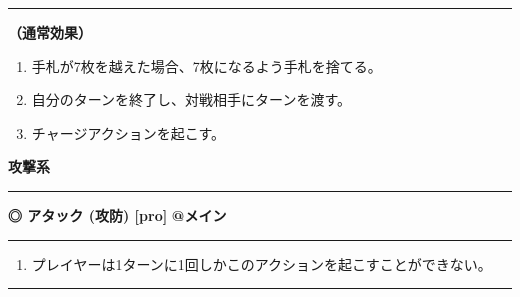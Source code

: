 \documentclass[twocolumn,a5paper,papersize,10pt]{jarticle}
\begin{document}
\vspace{1mm}%
\hrule height 0.1mm depth 0mm width 66.5mm %
\vspace{1mm}%

{\bf（通常効果）}


\vspace{-1zh}%
\begin{enumerate}
\setlength{\leftskip}{-0.3cm}
\setlength{\parskip}{0pt} %

\item 手札が7枚を越えた場合、7枚になるよう手札を捨てる。

\item 自分のターンを終了し、対戦相手にターンを渡す。

\item チャージアクションを起こす。
\vspace{-1zh}%
\end{enumerate}


\begin{tcolorbox}
{\scriptsize\bf 攻撃系}
\end{tcolorbox}
\vspace{-1zh}%
\vspace{2mm} %
\hrule height 0.5mm depth 0mm width 66.5mm %
\vspace{1mm} %
{\small\bf ◎ アタック {\scriptsize (攻防) [pro]}} %
\hfill 
{\footnotesize\bf @メイン }


\vspace{1mm}%
\hrule height 0.1mm depth 0mm width 66.5mm %
\vspace{1mm}%


\vspace{-1zh}%
\begin{enumerate}
\renewcommand{\labelenumi}{※}
\setlength{\leftskip}{-0.3cm}
\setlength{\itemsep}{0pt} %
\setlength{\parskip}{0pt} %

\item プレイヤーは1ターンに1回しかこのアクションを起こすことができない。

\vspace{-3mm}%
\end{enumerate}
\vspace{1mm}%
\hrule height 0.1mm depth 0mm width 66.5mm %
\vspace{1mm}%
\end{document}
